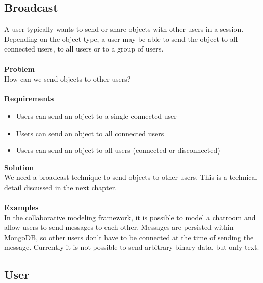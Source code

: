 \subsection{Broadcast}

A user typically wants to send or share objects with other users in a session. Depending on the object type, a user may be able to send the object to all connected users, to all users or to a group of users.
\\ \\
\textbf{Problem}
\\
How can we send objects to other users?
\\ \\
\textbf{Requirements}
\begin{itemize}
\item{Users can send an object to a single connected user}
\item{Users can send an object to all connected users}
\item{Users can send an object to all users (connected or disconnected)}
\end{itemize}
\textbf{Solution}
\\
We need a broadcast technique to send objects to other users. This is a technical detail discussed in the next chapter.
\\ \\
\textbf{Examples}
\\
In the collaborative modeling framework, it is possible to model a chatroom and allow users to send messages to each other. Messages are persisted within MongoDB, so other users don't have to be connected at the time of sending the message. Currently it is not possible to send arbitrary binary data, but only text.

\subsection{User}

